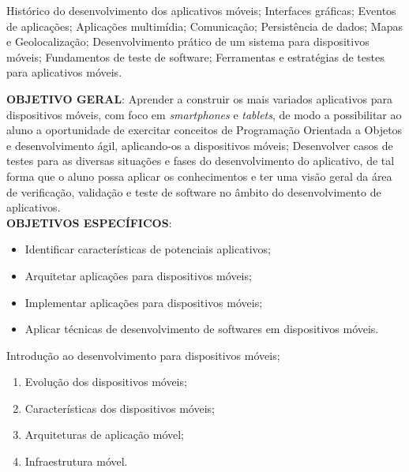 

\begin{pud}



	\ementa
	Histórico do desenvolvimento dos aplicativos móveis; Interfaces gráficas; Eventos de aplicações; Aplicações multimídia; Comunicação; Persistência de dados; Mapas e Geolocalização; Desenvolvimento prático de um sistema para dispositivos móveis; Fundamentos de teste de software; Ferramentas e estratégias de testes para aplicativos móveis.
	
	\objetivos
	\textbf{OBJETIVO GERAL}:
	Aprender a construir os mais variados aplicativos para dispositivos móveis, com foco em \textit{smartphones} e \textit{tablets}, de modo a possibilitar ao aluno a oportunidade de exercitar conceitos de Programação Orientada a Objetos e desenvolvimento ágil, aplicando-os a dispositivos móveis; Desenvolver casos de testes para as diversas situações e fases do desenvolvimento do aplicativo, de tal forma que o aluno possa aplicar os conhecimentos e ter uma visão geral da área de verificação, validação e teste de software no âmbito do desenvolvimento de aplicativos.	
	\newline\\	
	\textbf{OBJETIVOS ESPECÍFICOS}:
	\begin{itemize}
		
		\item Identificar características de potenciais aplicativos;
		\item Arquitetar aplicações para dispositivos móveis; 
		\item Implementar aplicações para dispositivos móveis; 
		\item Aplicar técnicas de desenvolvimento de softwares em dispositivos móveis. 

	\end{itemize}
	
	
	\programa
	\begin{description}[itemsep=0em]
		\item[UNIDADE I:] Introdução ao desenvolvimento para dispositivos móveis; 
	         \begin{enumerate}[itemsep=0em, topsep=0em]
				\item Evolução dos dispositivos móveis;
				\item Características dos dispositivos móveis;
				\item Arquiteturas de aplicação móvel;
				\item Infraestrutura móvel.
            \end{enumerate}
            

\end{description}
\end{pud}
